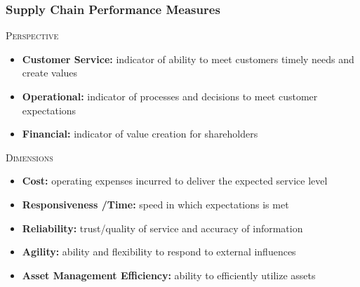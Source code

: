 \documentclass[10pt,handout,notes=show]{beamer}
\begin{document}
\begin{frame}
  \frametitle{Supply Chain Performance Measures}

  \textsc{Perspective}
  \begin{itemize}
    \item \textbf{Customer Service:} indicator of ability to meet \alert{customers} timely needs and create values
    \item \textbf{Operational:} indicator of \alert{processes} and \alert{decisions} to meet customer expectations
    \item \textbf{Financial:} indicator of value creation for \alert{shareholders}
  \end{itemize}

  \NextHalfLine
  \textsc{Dimensions}
    \begin{itemize}
      \item \textbf{Cost:} operating expenses incurred to deliver the expected service level
      \item \textbf{Responsiveness /Time:} speed in which expectations is met
      \item \textbf{Reliability:} trust/\alert{quality} of service and accuracy of information
      \item \textbf{Agility:}  ability and flexibility to \alert{respond to external} influences
      \item \textbf{Asset Management Efficiency:} ability to efficiently utilize \alert{assets}
    \end{itemize}

\end{frame}
\end{document}

